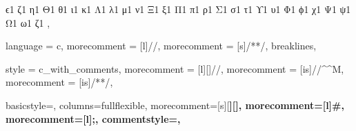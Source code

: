 {{%
	            {ϵ}{{\textepsilon}}1%
	            {ζ}{{\textzeta}}1%
	            {η}{{\texteta}}1%
	            {Θ}{{\textTheta}}1
	            {θ}{{\texttheta}}1%
	            {ι}{{\textiota}}1%
	            {κ}{{\textkappa}}1%
	            {Λ}{{\textLambda}}1
	            {λ}{{\textlambda}}1%
	            {μ}{{\textmu}}1%
	            {ν}{{\textnu}}1%
	            {Ξ}{{\textXi}}1
	            {ξ}{{\textxi}}1%
	            {Π}{{\textPi}}1
	            {π}{{\textpi}}1%
	            {ρ}{{\textrho}}1%
	            {Σ}{{\textSigma}}1
	            {σ}{{\textsigma}}1%
	            {τ}{{\texttau}}1%
	            {ϒ}{{\textUpsilon}}1
	            {υ}{{\textupsilon}}1%
	            {Φ}{{\textPhi}}1
	            {ϕ}{{\textphi}}1%
	            {χ}{{\textchi}}1%
	            {Ψ}{{\textPsi}}1
	            {ψ}{{\textpsi}}1%
	            {Ω}{{\textOmega}}1
	            {ω}{{\textomega}}1%
	            {ζ}{{\varsigma}}1%
	         },
}

%
{
	language     = c,
	morecomment  = [l]{//},
	morecomment  = [s]{/*}{*/},
	breaklines,
}

%
{
	style        = c_with_comments,
	morecomment  = [l][\nullfont]{//},
	morecomment  = [is]{//}{\^^M},
	morecomment  = [is]{/*}{*/},
}

{
	basicstyle=\ttfamily\small,
	columns=fullflexible,
	morecomment=[s][\color{Orchid}\bfseries]{[}{]},
	morecomment=[l]{\#},
	morecomment=[l]{;},
	commentstyle=\color{gray}\ttfamily,
}





